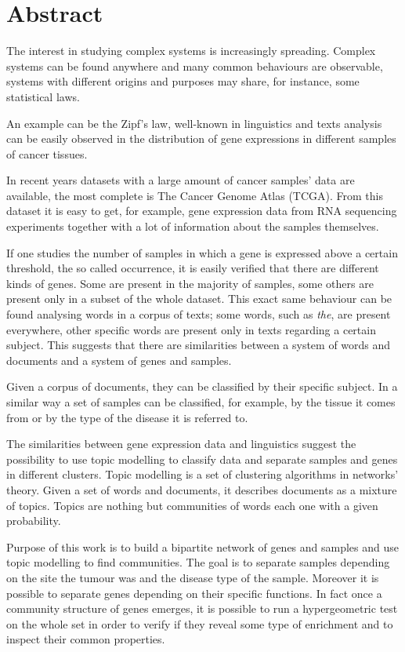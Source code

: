 \chapter*{Abstract}
The interest in studying complex systems is increasingly spreading. Complex systems can be found anywhere and many common behaviours are observable, systems with different origins and purposes may share, for instance, some statistical laws.

An example can be the Zipf's law, well-known in linguistics and texts analysis can be easily observed in the distribution of gene expressions in different samples of cancer tissues.

In recent years datasets with a large amount of cancer samples' data are available, the most complete is The Cancer Genome Atlas (TCGA). From this dataset it is easy to get, for example, gene expression data from RNA sequencing experiments together with a lot of information about the samples themselves.

If one studies the number of samples in which a gene is expressed above a certain threshold, the so called occurrence, it is easily verified that there are different kinds of genes. Some are present in the majority of samples, some others are present only in a subset of the whole dataset. This exact same behaviour can be found analysing words in a corpus of texts; some words, such as \textit{the}, are present everywhere, other specific words are present only in texts regarding a certain subject. This suggests that there are similarities between a system of words and documents and a system of genes and samples.

Given a corpus of documents, they can be classified by their specific subject. In a similar way a set of samples can be classified, for example, by the tissue it comes from or by the type of the disease it is referred to.

The similarities between gene expression data and linguistics suggest the possibility to use topic modelling to classify data and separate samples and genes in different clusters. Topic modelling is a set of clustering algorithms in networks' theory. Given a set of words and documents, it describes documents as a mixture of topics. Topics are nothing but communities of words each one with a given probability. 

Purpose of this work is to build a bipartite network of genes and samples and use topic modelling to find communities. The goal is to separate samples depending on the site the tumour was and the disease type of the sample. Moreover it is possible to separate genes depending on their specific functions. 
In fact once a community structure of genes emerges, it is possible to run a hypergeometric test on the whole set in order to verify 
if they reveal some type of enrichment and to inspect their common properties.

